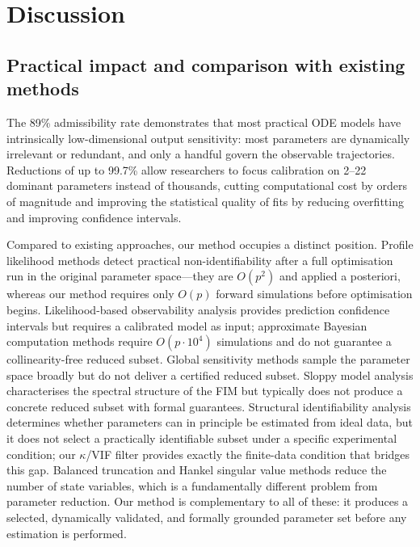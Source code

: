 \documentclass[pdflatex,sn-nature]{sn-jnl}
\begin{document}
\section{Discussion}\label{sec:discussion}


\subsection{Practical impact and comparison with existing methods}\label{sec:impact}


The 89\% admissibility rate demonstrates that most practical ODE models have intrinsically low-dimensional output sensitivity: most parameters are dynamically irrelevant or redundant, and only a handful govern the observable trajectories. Reductions of up to 99.7\% allow researchers to focus calibration on 2--22 dominant parameters instead of thousands, cutting computational cost by orders of magnitude and improving the statistical quality of fits by reducing overfitting and improving confidence intervals.


Compared to existing approaches, our method occupies a distinct position. Profile likelihood methods \cite{bib24,bib25} detect practical non-identifiability after a full optimisation run in the original parameter space---they are $O(p^2)$ and applied a posteriori, whereas our method requires only $O(p)$ forward simulations before optimisation begins. Likelihood-based observability analysis \cite{bib17} provides prediction confidence intervals but requires a calibrated model as input; approximate Bayesian computation methods \cite{bib20} require $O(p\cdot 10^4)$ simulations and do not guarantee a collinearity-free reduced subset. Global sensitivity methods \cite{bib26,bib23} sample the parameter space broadly but do not deliver a certified reduced subset. Sloppy model analysis \cite{bib15} characterises the spectral structure of the FIM but typically does not produce a concrete reduced subset with formal guarantees. Structural identifiability analysis \cite{bib4,bib10,bib29} determines whether parameters can in principle be estimated from ideal data, but it does not select a practically identifiable subset under a specific experimental condition; our $\kappa$/VIF filter provides exactly the finite-data condition that bridges this gap. Balanced truncation and Hankel singular value methods \cite{bib22,bib1} reduce the number of state variables, which is a fundamentally different problem from parameter reduction. Our method is complementary to all of these: it produces a selected, dynamically validated, and formally grounded parameter set before any estimation is performed.
\end{document}
